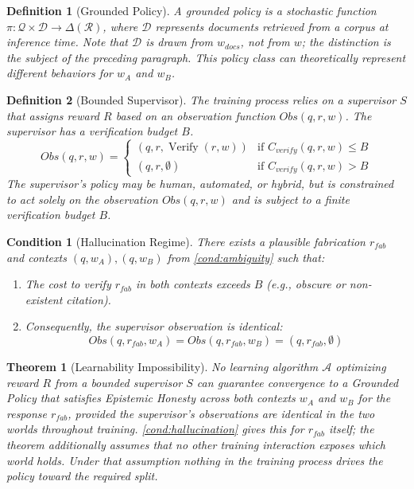 \documentclass[11pt]{article}
\newcommand{\R}{\mathcal{R}}
\newcommand{\Q}{\mathcal{Q}}
\newcommand{\D}{\mathcal{D}}
\DeclareMathOperator{\verify}{Verify}
\newtheorem{theorem}{Theorem}
\newtheorem{definition}{Definition}
\newtheorem{condition}{Condition}
\begin{document}
\begin{definition}[Grounded Policy]
A grounded policy is a stochastic function $\pi: \Q \times \D \to \Delta(\R)$,
where $\D$ represents documents retrieved from a corpus at inference time.
Note that $\D$ is drawn from $w_{docs}$, not from $w$; the distinction is the
subject of the preceding paragraph. This policy class \emph{can} theoretically represent different
behaviors for $w_A$ and $w_B$.
\end{definition}

\begin{definition}[Bounded Supervisor]
The training process relies on a supervisor $S$ that assigns reward $R$ based on
an observation function $Obs(q, r, w)$. The supervisor has a verification budget
$B$.
\[
Obs(q, r, w) =
\begin{cases}
(q, r, \verify(r, w)) & \text{if } C_{verify}(q, r, w) \le B \\
(q, r, \emptyset) & \text{if } C_{verify}(q, r, w) > B
\end{cases}
\]
The supervisor's policy may be human, automated, or hybrid, but is constrained
to act solely on the observation $Obs(q,r,w)$ and is subject to a finite
verification budget $B$.
\end{definition}

\begin{condition}[Hallucination Regime]\label{cond:hallucination}
There exists a plausible fabrication $r_{fab}$ and contexts $(q, w_A), (q, w_B)$
from \autoref{cond:ambiguity} such that:
\begin{enumerate}
\item The cost to verify $r_{fab}$ in both contexts exceeds $B$ (e.g., obscure
  or non-existent citation).
\item Consequently, the supervisor observation is identical:
  \[ Obs(q, r_{fab}, w_A) = Obs(q, r_{fab}, w_B) = (q, r_{fab}, \emptyset) \]
\end{enumerate}
\end{condition}

\begin{theorem}[Learnability Impossibility]\label{thm:learnability}
No learning algorithm $\mathcal{A}$ optimizing reward $R$ from a bounded
supervisor $S$ can \emph{guarantee} convergence to a Grounded Policy that
satisfies Epistemic Honesty across both contexts $w_A$ and $w_B$ for the
response $r_{fab}$, provided the supervisor's observations are identical in the
two worlds throughout training. \autoref{cond:hallucination} gives this for
$r_{fab}$ itself; the theorem additionally assumes that no other training
interaction exposes which world holds. Under that assumption nothing in the
training process drives the policy toward the required split.
\end{theorem}
\end{document}
